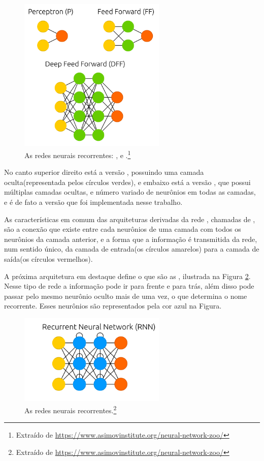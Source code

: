 \begin{figure}[htb]
\centering
\includegraphics[width=7cm]{figuras/estrutura_p}
\caption{As redes neurais recorrentes: ,  e .\footnote{Extraído de \url{https://www.asimovinstitute.org/neural-network-zoo/}}}
\label{fig:estrutura_p}
\end{figure}

No canto superior direito está a versão , possuindo uma camada oculta(representada pelos círculos verdes), e embaixo está a versão , que possui múltiplas camadas ocultas, e número variado de neurônios em todas as camadas, e é de fato a versão que foi implementada nesse trabalho.

As características em comum das arquiteturas derivadas da rede , chamadas de , são a conexão que existe entre cada neurônios de uma camada com todos os neurônios da camada anterior, e a forma que a informação é transmitida da rede, num sentido único, da camada de entrada(os círculos amarelos) para a camada de saída(os círculos vermelhos).

A próxima arquitetura em destaque define o que são as , ilustrada na Figura \ref{fig:estrutura_r}. Nesse tipo de rede a informação pode ir para frente e para trás, além disso pode passar pelo mesmo neurônio oculto mais de uma vez, o que determina o nome recorrente. Esses neurônios são representados pela cor azul na Figura.

\begin{figure}[htb]
\centering
\includegraphics[width=7cm]{figuras/estrutura_r}
\caption{As redes neurais recorrentes.\footnote{Extraído de \url{https://www.asimovinstitute.org/neural-network-zoo/}}}
\label{fig:estrutura_r}
\end{figure}

